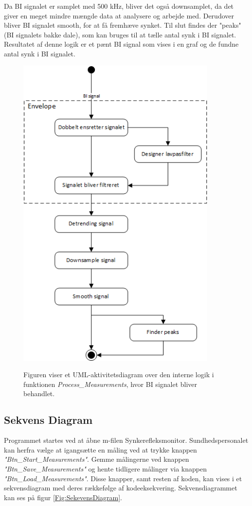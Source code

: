 Da BI signalet er samplet med 500 kHz, bliver det også downsamplet, da det giver en meget mindre mængde data at analysere og arbejde med. Derudover bliver BI signalet smooth, for at få fremhæve synket. Til slut findes der "peaks" (BI signalets bakke dale), som kan bruges til at tælle antal synk i BI signalet. Resultatet af denne logik er et pænt BI signal som vises i en graf og de fundne antal synk i BI signalet. 

\begin{figure}[H]
\centering
{\includegraphics[width=10cm]
{Figure/designSWenvelope}}
\caption{Figuren viser et UML-aktivitetsdiagram over den interne logik i funktionen \textit{Process\_Measurements}, hvor BI signalet bliver behandlet. }
\label{fig:designSWenvelope}
\end{figure}


\subsection{Sekvens Diagram}

Programmet startes ved at åbne m-filen Synkerefleksmonitor. Sundhedspersonalet kan herfra vælge at igangsætte en måling ved at trykke knappen \textit{"Btn\_Start\_Measurements"}. Gemme målingerne ved knappen \textit{"Btn\_Save\_Measurements"} og hente tidligere målinger via knappen \textit{"Btn\_Load\_Measurements"}. Disse knapper, samt resten af koden, kan vises i et sekvensdiagram med deres rækkefølge af kodeeksekvering. Sekvensdiagrammet kan ses på figur \ref{Fig:SekevensDiagram}.


